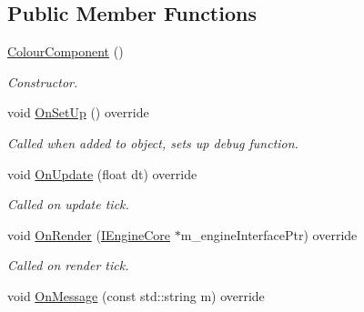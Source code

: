 \subsection*{Public Member Functions}
\begin{DoxyCompactItemize}
\item 
\hypertarget{class_colour_component_aea6cf99fa40f6ed6d670e89fab944b1c}{\hyperlink{class_colour_component_aea6cf99fa40f6ed6d670e89fab944b1c}{Colour\+Component} ()}\label{class_colour_component_aea6cf99fa40f6ed6d670e89fab944b1c}

\begin{DoxyCompactList}\small\item\em Constructor. \end{DoxyCompactList}\item 
\hypertarget{class_colour_component_a80105f216269f3282c51918a0d13c12d}{void \hyperlink{class_colour_component_a80105f216269f3282c51918a0d13c12d}{On\+Set\+Up} () override}\label{class_colour_component_a80105f216269f3282c51918a0d13c12d}

\begin{DoxyCompactList}\small\item\em Called when added to object, sets up debug function. \end{DoxyCompactList}\item 
\hypertarget{class_colour_component_ae45e91aebb680031bb1328c7c189ea15}{void \hyperlink{class_colour_component_ae45e91aebb680031bb1328c7c189ea15}{On\+Update} (float dt) override}\label{class_colour_component_ae45e91aebb680031bb1328c7c189ea15}

\begin{DoxyCompactList}\small\item\em Called on update tick. \end{DoxyCompactList}\item 
\hypertarget{class_colour_component_a2038d839286cb0a5f0eec0cc11780700}{void \hyperlink{class_colour_component_a2038d839286cb0a5f0eec0cc11780700}{On\+Render} (\hyperlink{class_i_engine_core}{I\+Engine\+Core} $\ast$m\+\_\+engine\+Interface\+Ptr) override}\label{class_colour_component_a2038d839286cb0a5f0eec0cc11780700}

\begin{DoxyCompactList}\small\item\em Called on render tick. \end{DoxyCompactList}\item 
\hypertarget{class_colour_component_a40b859f0c124ddbe92ff1e53bdb398a0}{void \hyperlink{class_colour_component_a40b859f0c124ddbe92ff1e53bdb398a0}{On\+Message} (const std\+::string m) override}\label{class_colour_component_a40b859f0c124ddbe92ff1e53bdb398a0}


\end{DoxyCompactItemize}
